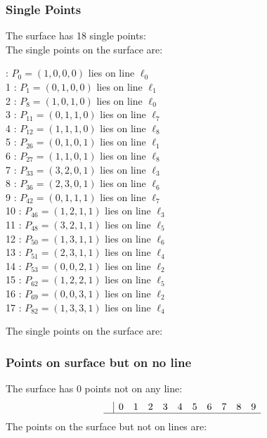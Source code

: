 \documentclass{article}
\begin{document}
{\subsubsection*{Single Points}
The surface has 18 single points:\\
The single points on the surface are:\\
\begin{multicols}{2}
 : $P_{0}=( 1, 0, 0, 0 )$ lies on line $\ell_{0}$\\
1 : $P_{1}=( 0, 1, 0, 0 )$ lies on line $\ell_{1}$\\
2 : $P_{8}=( 1, 0, 1, 0 )$ lies on line $\ell_{0}$\\
3 : $P_{11}=( 0, 1, 1, 0 )$ lies on line $\ell_{7}$\\
4 : $P_{12}=( 1, 1, 1, 0 )$ lies on line $\ell_{8}$\\
5 : $P_{26}=( 0, 1, 0, 1 )$ lies on line $\ell_{1}$\\
6 : $P_{27}=( 1, 1, 0, 1 )$ lies on line $\ell_{8}$\\
7 : $P_{33}=( 3, 2, 0, 1 )$ lies on line $\ell_{3}$\\
8 : $P_{36}=( 2, 3, 0, 1 )$ lies on line $\ell_{6}$\\
9 : $P_{42}=( 0, 1, 1, 1 )$ lies on line $\ell_{7}$\\
10 : $P_{46}=( 1, 2, 1, 1 )$ lies on line $\ell_{3}$\\
11 : $P_{48}=( 3, 2, 1, 1 )$ lies on line $\ell_{5}$\\
12 : $P_{50}=( 1, 3, 1, 1 )$ lies on line $\ell_{6}$\\
13 : $P_{51}=( 2, 3, 1, 1 )$ lies on line $\ell_{4}$\\
14 : $P_{53}=( 0, 0, 2, 1 )$ lies on line $\ell_{2}$\\
15 : $P_{62}=( 1, 2, 2, 1 )$ lies on line $\ell_{5}$\\
16 : $P_{69}=( 0, 0, 3, 1 )$ lies on line $\ell_{2}$\\
17 : $P_{82}=( 1, 3, 3, 1 )$ lies on line $\ell_{4}$\\
\end{multicols}
The single points on the surface are:\\
\subsubsection*{Points on surface but on no line}
The surface has 0 points not on any line:\\
$$
\begin{array}{r|*{10}{r}}
 & 0 & 1 & 2 & 3 & 4 & 5 & 6 & 7 & 8 & 9\\
\hline
\end{array}
$$
The points on the surface but not on lines are:\\
\begin{multicols}{2}
\noindent
\end{multicols}
}
\end{document}
